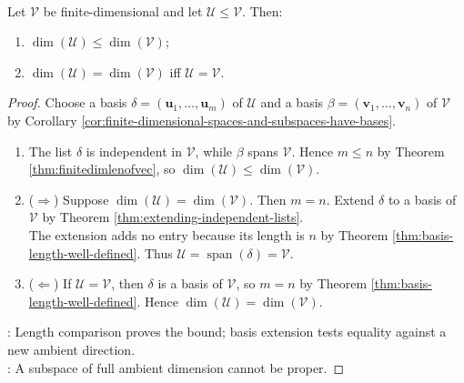 \begin{proposition} \label{prop:dimension-bounds-and-basis-criteria} \\
Let $\mathcal{V}$ be finite-dimensional and let $\mathcal{U}\leq\mathcal{V}$. Then:
\begin{enumerate}[label=(\roman*)]
\setlength{\itemsep}{0pt}
\item $\dim(\mathcal{U})\leq\dim(\mathcal{V})$;
\item $\dim(\mathcal{U})=\dim(\mathcal{V})$ iff $\mathcal{U}=\mathcal{V}$.
\end{enumerate}
\begin{proof}
Choose a basis $\delta=(\mathbf{u}_1,\ldots,\mathbf{u}_m)$ of $\mathcal{U}$ and a basis $\beta=(\mathbf{v}_1,\ldots,\mathbf{v}_n)$ of $\mathcal{V}$ by Corollary \ref{cor:finite-dimensional-spaces-and-subspaces-have-bases}.
\begin{enumerate}[label=(\roman*)]
\setlength{\itemsep}{0pt}
\item[$(i)$] The list $\delta$ is independent in $\mathcal{V}$, while $\beta$ spans $\mathcal{V}$. Hence $m\leq n$ by Theorem \ref{thm:finitedimlenofvec}, so $\dim(\mathcal{U})\leq\dim(\mathcal{V})$.
\item[$(ii)$] ($\Rightarrow$) Suppose $\dim(\mathcal{U})=\dim(\mathcal{V})$. Then $m=n$. Extend $\delta$ to a basis of $\mathcal{V}$ by Theorem \ref{thm:extending-independent-lists}.\\
The extension adds no entry because its length is $n$ by Theorem \ref{thm:basis-length-well-defined}. Thus $\mathcal{U}=\operatorname{span}(\delta)=\mathcal{V}$.
\item[$(ii)$] ($\Leftarrow$) If $\mathcal{U}=\mathcal{V}$, then $\delta$ is a basis of $\mathcal{V}$, so $m=n$ by Theorem \ref{thm:basis-length-well-defined}. Hence $\dim(\mathcal{U})=\dim(\mathcal{V})$.
\end{enumerate}
: Length comparison proves the bound; basis extension tests equality against a new ambient direction.\\
: A subspace of full ambient dimension cannot be proper.
\end{proof}
\end{proposition}

